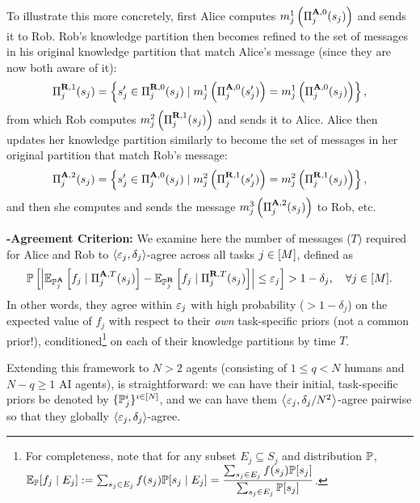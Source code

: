 To illustrate this more concretely, first Alice computes $m^{1}_j\left(\Pi_j^{\mathbf{A},0}(s_j)\right)$ and sends it to Rob.
Rob's knowledge partition then becomes refined to the set of messages in his original knowledge partition that match Alice's message (since they are now both aware of it):
\begin{equation*}
\Pi_j^{\mathbf{R},1}(s_j) = \left\{s'_j \in \Pi_j^{\mathbf{R},0}(s_j) \mid  m^1_j\left(\Pi_j^{\mathbf{A},0}(s'_j)\right) = m^1_j\left(\Pi_j^{\mathbf{A},0}(s_j)\right)\right\},
\end{equation*}
from which Rob computes $m^2_j\left(\Pi_j^{\mathbf{R},1}(s_j)\right)$ and sends it to Alice.
Alice then updates her knowledge partition similarly to become the set of messages in her original partition that match Rob's message:
\begin{equation*}
\Pi_j^{\mathbf{A},2}(s_j) = \left\{s'_j \in \Pi_j^{\mathbf{A},0}(s_j) \mid  m^2_j\left(\Pi_j^{\mathbf{R},1}(s'_j)\right) = m^2_j\left(\Pi_j^{\mathbf{R},1}(s_j)\right)\right\},
\end{equation*}
and then she computes and sends the message $m^{3}_j\left(\Pi_j^{\mathbf{A},2}(s_j)\right)$ to Rob, etc.

\textbf{\agree-Agreement Criterion:} We examine here the number of messages ($T$) required for Alice and Rob to $\left \langle \varepsilon_j, \delta_j \right \rangle $-agree across all tasks $j \in [M]$, defined as
\begin{equation}\label{eq:eps-delta}
\mathbb{P}\left[\left|\mathbb{E}_{{\mathbb{P}}^{\mathbf{A}}_j}\left[f_j\mid \Pi_j^{\mathbf{A},T}(s_j)\right] - \mathbb{E}_{{\mathbb{P}}^{\mathbf{R}}_j}\left[f_j\mid \Pi_j^{\mathbf{R},T}(s_j)\right]\right| \le \varepsilon_j \right] > 1-\delta_j, \quad \forall j \in [M].
\end{equation}
In other words, they agree within $\varepsilon_j$ with high probability ($> 1-\delta_j$) on the expected value of $f_j$ with respect to their \emph{own} task-specific priors (not a common prior!), conditioned\footnote{For completeness, note that for any subset $E_j\subseteq S_j$ and distribution $\mathbb{P}$, $\mathbb{E}_{\mathbb{P}}[f_j\mid E_j] := \sum_{s_j \in E_j}f(s_j)\mathbb{P}[s_j \mid E_j] = \dfrac{\sum_{s_j \in E_j}f(s_j)\mathbb{P}[s_j]}{\sum_{s_j\in E_j}\mathbb{P}[s_j]}$.} on each of their knowledge partitions by time $T$.

Extending this framework to $N > 2$ agents (consisting of $1 \le q < N$ humans and $N-q \ge 1$ AI agents), is straightforward: we can have their initial, task-specific priors be denoted by $\{\mathbb{P}_j^i\}^{i \in [N]}$, and we can have them $\left \langle \varepsilon_j, \delta_j/N^2 \right \rangle $-agree pairwise so that they globally $\left \langle \varepsilon_j, \delta_j \right \rangle $-agree.
\newline\newline

